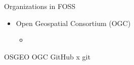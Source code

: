 \documentclass{beamer}
\begin{document}
\begin{frame}[allowframebreaks]{Organizations in FOSS}
\begin{itemize}
                    

                \item Open Geospatial Consortium (OGC)
                \begin{itemize}
                    \item
                \end{itemize}
                
            \end{itemize}
        \end{frame}
        
        OSGEO
        OGC
        GitHub x git
        \nocite{*}
        \frame[shrink=30]{\printbibliography[heading=bibintoc]}
    
\end{document}

